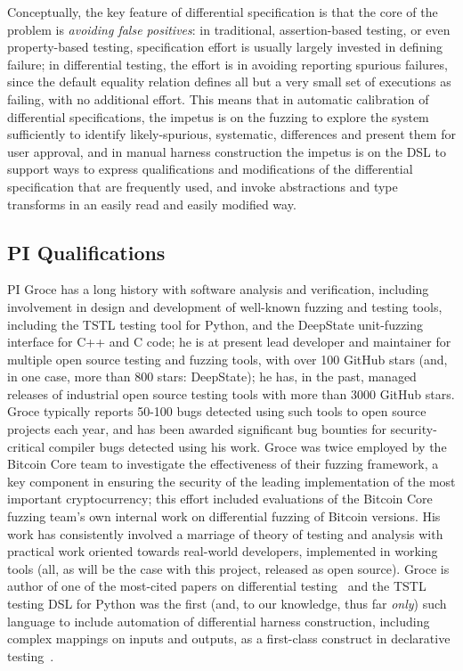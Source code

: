 Conceptually, the key feature of differential specification is that
the core of the problem is \emph{avoiding false positives}: in
traditional, assertion-based testing, or even property-based testing,
specification effort is usually largely invested in defining failure; in differential
testing, the effort is in avoiding reporting spurious failures, since
the default equality relation defines all but a very small set of
executions as failing, with no additional effort.  This means that in
automatic calibration of differential specifications, the impetus is
on the fuzzing to explore the system sufficiently to identify
likely-spurious, systematic, differences and present them for user
approval, and in manual harness construction the impetus is on the DSL
to support ways to express qualifications and modifications of the
differential specification that are frequently used, and invoke
abstractions and type transforms in an easily read and easily modified way.

\subsection{PI Qualifications}

PI Groce has a long history with software analysis and verification,
including involvement in design and development of well-known fuzzing
and testing tools, including the TSTL testing tool for Python, and the DeepState
unit-fuzzing interface for C++ and C code; he is at present lead developer and
maintainer for multiple open source testing and fuzzing tools, with over 100
GitHub stars (and, in one case, more than 800 stars: DeepState); he has, in the
past, managed releases of industrial open source testing tools with
more than 3000 GitHub stars.  
Groce typically reports 50-100
bugs detected using such tools to open source projects each year, and
has been awarded significant bug bounties for security-critical
compiler bugs detected using his work.  Groce was twice employed by
the Bitcoin Core team to investigate the effectiveness of their
fuzzing framework, a key component in ensuring the security of the
leading implementation of the most important cryptocurrency; this
effort included evaluations of the Bitcoin Core fuzzing team's own
internal work on differential fuzzing of Bitcoin versions.  His work
has consistently involved a marriage of theory of testing and
analysis with practical work oriented towards real-world
developers, implemented in working tools (all, as will be the case with this
project, released as open source).  Groce is author of one of the
most-cited papers on differential testing~\cite{ICSEDiff} and the TSTL testing
DSL for Python was the first (and, to our knowledge, thus far
\emph{only}) such language to include automation of
differential harness construction, including complex mappings on inputs and
outputs, as a first-class construct in declarative testing~\cite{ISSTA15,tstl}.
